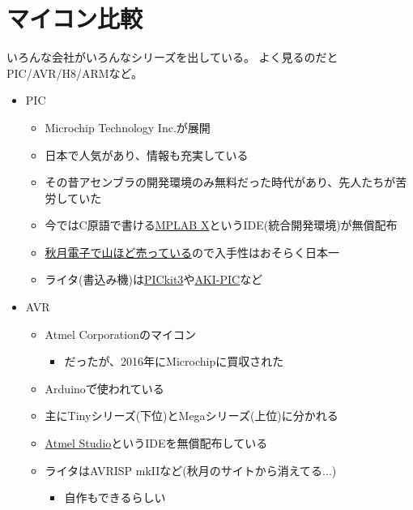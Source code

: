 \documentclass[letterpaper,10pt,dvipdfmx]{sphinxmanual}
\begin{document}
\section{マイコン比較}
\label{\detokenize{begginers/microcontroller:id3}}
いろんな会社がいろんなシリーズを出している。
よく見るのだとPIC/AVR/H8/ARMなど。
\begin{itemize}
\item {} 
PIC
\begin{itemize}
\item {} 
Microchip Technology Inc.が展開

\item {} 
日本で人気があり、情報も充実している

\item {} 
その昔アセンブラの開発環境のみ無料だった時代があり、先人たちが苦労していた

\item {} 
今ではC原語で書ける\href{http://www.microchip.com/ja/mplab/mplab-x-ide}{MPLAB
X}というIDE(統合開発環境)が無償配布

\item {} 
\href{http://akizukidenshi.com/catalog/c/cpicr/}{秋月電子で山ほど売っている}ので入手性はおそらく日本一

\item {} 
ライタ(書込み機)は\href{http://akizukidenshi.com/catalog/g/gM-03608/}{PICkit3}や\href{http://akizukidenshi.com/catalog/g/gK-02018}{AKI-PIC}など

\end{itemize}

\item {} 
AVR
\begin{itemize}
\item {} 
Atmel Corporationのマイコン
\begin{itemize}
\item {} 
だったが、2016年にMicrochipに買収された

\end{itemize}

\item {} 
Arduinoで゙使われている

\item {} 
主にTinyシリーズ(下位)とMegaシリーズ(上位)に分かれる

\item {} 
\href{http://www.atmel.com/ja/jp/microsite/atmel-studio/default.aspx}{Atmel
Studio}というIDEを無償配布している

\item {} 
ライタはAVRISP mkIIなど(秋月のサイトから消えてる...)
\begin{itemize}
\item {} 
自作もできるらしい


\end{itemize}
\end{itemize}
\end{itemize}
\end{document}
